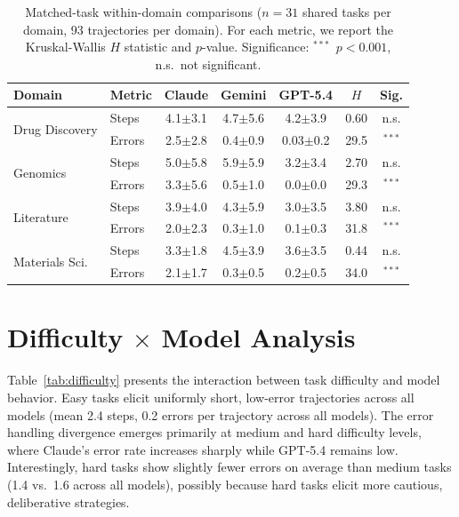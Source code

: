 \documentclass{article}
\begin{document}
\begin{table}[h]
\caption{Matched-task within-domain comparisons ($n=31$ shared tasks per domain, 93 trajectories per domain). For each metric, we report the Kruskal-Wallis $H$ statistic and $p$-value. Significance: $^{***}$~$p<0.001$, n.s.~not significant.}
\label{tab:matched}
\centering
\small
\begin{tabular}{llccccc}
\toprule
\textbf{Domain} & \textbf{Metric} & \textbf{Claude} & \textbf{Gemini} & \textbf{GPT-5.4} & \textbf{$H$} & \textbf{Sig.} \\
\midrule
\multirow{2}{*}{Drug Discovery} & Steps & 4.1$\pm$3.1 & 4.7$\pm$5.6 & 4.2$\pm$3.9 & 0.60 & n.s. \\
& Errors & 2.5$\pm$2.8 & 0.4$\pm$0.9 & 0.03$\pm$0.2 & 29.5 & $^{***}$ \\
\midrule
\multirow{2}{*}{Genomics} & Steps & 5.0$\pm$5.8 & 5.9$\pm$5.9 & 3.2$\pm$3.4 & 2.70 & n.s. \\
& Errors & 3.3$\pm$5.6 & 0.5$\pm$1.0 & 0.0$\pm$0.0 & 29.3 & $^{***}$ \\
\midrule
\multirow{2}{*}{Literature} & Steps & 3.9$\pm$4.0 & 4.3$\pm$5.9 & 3.0$\pm$3.5 & 3.80 & n.s. \\
& Errors & 2.0$\pm$2.3 & 0.3$\pm$1.0 & 0.1$\pm$0.3 & 31.8 & $^{***}$ \\
\midrule
\multirow{2}{*}{Materials Sci.} & Steps & 3.3$\pm$1.8 & 4.5$\pm$3.9 & 3.6$\pm$3.5 & 0.44 & n.s. \\
& Errors & 2.1$\pm$1.7 & 0.3$\pm$0.5 & 0.2$\pm$0.5 & 34.0 & $^{***}$ \\
\bottomrule
\end{tabular}
\end{table}

\section{Difficulty $\times$ Model Analysis}
\label{app:difficulty}

Table~\ref{tab:difficulty} presents the interaction between task difficulty and model behavior. Easy tasks elicit uniformly short, low-error trajectories across all models (mean 2.4 steps, 0.2 errors per trajectory across all models). The error handling divergence emerges primarily at medium and hard difficulty levels, where Claude's error rate increases sharply while GPT-5.4 remains low. Interestingly, hard tasks show slightly fewer errors on average than medium tasks (1.4 vs.\ 1.6 across all models), possibly because hard tasks elicit more cautious, deliberative strategies.
\end{document}
